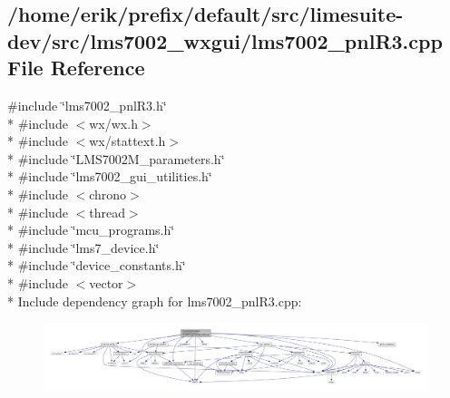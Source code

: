 \subsection{/home/erik/prefix/default/src/limesuite-\/dev/src/lms7002\+\_\+wxgui/lms7002\+\_\+pnl\+R3.cpp File Reference}
\label{lms7002__pnlR3_8cpp}
{\ttfamily \#include \char`\"{}lms7002\+\_\+pnl\+R3.\+h\char`\"{}}\\*
{\ttfamily \#include $<$wx/wx.\+h$>$}\\*
{\ttfamily \#include $<$wx/stattext.\+h$>$}\\*
{\ttfamily \#include \char`\"{}L\+M\+S7002\+M\+\_\+parameters.\+h\char`\"{}}\\*
{\ttfamily \#include \char`\"{}lms7002\+\_\+gui\+\_\+utilities.\+h\char`\"{}}\\*
{\ttfamily \#include $<$chrono$>$}\\*
{\ttfamily \#include $<$thread$>$}\\*
{\ttfamily \#include \char`\"{}mcu\+\_\+programs.\+h\char`\"{}}\\*
{\ttfamily \#include \char`\"{}lms7\+\_\+device.\+h\char`\"{}}\\*
{\ttfamily \#include \char`\"{}device\+\_\+constants.\+h\char`\"{}}\\*
{\ttfamily \#include $<$vector$>$}\\*
Include dependency graph for lms7002\+\_\+pnl\+R3.\+cpp\+:
\nopagebreak
\begin{figure}[H]
\begin{center}
\leavevmode
\includegraphics[width=350pt]{d9/d0b/lms7002__pnlR3_8cpp__incl}
\end{center}
\end{figure}
